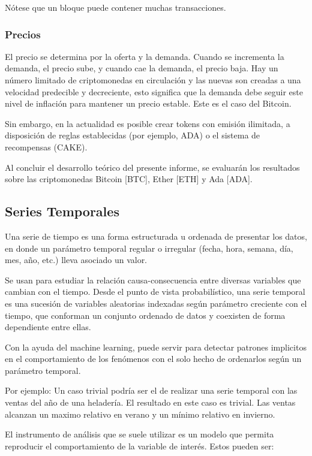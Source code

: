 \documentclass[a4paper,10pt]{article}
\begin{document}
Nótese que un bloque puede contener muchas transacciones.

\subsubsection{Precios}

 El precio se determina por la oferta y la demanda. Cuando se incrementa la demanda, el precio sube, y cuando cae la demanda, el precio baja. Hay un número limitado de criptomonedas en circulación y las nuevas son creadas a una velocidad predecible y decreciente, esto significa que la demanda debe seguir este nivel de inflación para mantener un precio estable. Este es el caso del Bitcoin.

 Sin embargo, en la actualidad es posible crear tokens con emisión ilimitada, a disposición de reglas establecidas (por ejemplo, ADA) o el sistema de recompensas (CAKE).

 Al concluir el desarrollo teórico del presente informe, se evaluarán los resultados sobre las criptomonedas Bitcoin [BTC], Ether [ETH] y Ada [ADA].

\subsection{Series Temporales}

Una serie de tiempo es una forma estructurada u ordenada de presentar los datos, en donde un parámetro temporal regular o irregular (fecha, hora, semana, día, mes, año, etc.) lleva asociado un valor.

Se usan para estudiar la relación causa-consecuencia entre diversas variables que cambian con el tiempo. Desde el punto de vista probabilístico, una serie temporal es una sucesión de variables aleatorias indexadas según parámetro creciente con el tiempo, que conforman un conjunto ordenado de datos y coexisten de forma dependiente entre ellas.

Con la ayuda del machine learning, puede servir para detectar patrones implicitos en el comportamiento de los fenómenos con el solo hecho de ordenarlos según un parámetro temporal.

Por ejemplo: Un caso trivial podría ser el de realizar una serie temporal con las ventas del año de una heladería. El resultado en este caso es trivial. Las ventas alcanzan un maximo relativo en verano y un mínimo relativo en invierno.

El instrumento de análisis que se suele utilizar es
un modelo que permita reproducir el comportamiento de la variable de interés. Estos pueden ser:
\end{document}
